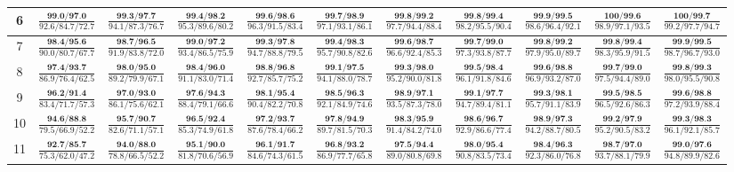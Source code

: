 \documentclass{slides}
\begin{document}
{{{\begin{tabular}{|c|c|c|c|c|c|c|c|c|c|c|}
\hline
6 & $\frac{\textbf{99.0/97.0}}{92.6/84.7/72.7}$ & $\frac{\textbf{99.3/97.7}}{94.1/87.3/76.7}$ & $\frac{\textbf{99.4/98.2}}{95.3/89.6/80.2}$ & $\frac{\textbf{99.6/98.6}}{96.3/91.5/83.4}$ & $\frac{\textbf{99.7/98.9}}{97.1/93.1/86.1}$ & $\frac{\textbf{99.8/99.2}}{97.7/94.4/88.4}$ & $\frac{\textbf{99.8/99.4}}{98.2/95.5/90.4}$ & $\frac{\textbf{99.9/99.5}}{98.6/96.4/92.1}$ & $\frac{\textbf{100/99.6}}{98.9/97.1/93.5}$ & $\frac{\textbf{100/99.7}}{99.2/97.7/94.7}$ \\
\hline
7 & $\frac{\textbf{98.4/95.6}}{90.0/80.7/67.7}$ & $\frac{\textbf{98.7/96.5}}{91.9/83.8/72.0}$ & $\frac{\textbf{99.0/97.2}}{93.4/86.5/75.9}$ & $\frac{\textbf{99.3/97.8}}{94.7/88.8/79.5}$ & $\frac{\textbf{99.4/98.3}}{95.7/90.8/82.6}$ & $\frac{\textbf{99.6/98.7}}{96.6/92.4/85.3}$ & $\frac{\textbf{99.7/99.0}}{97.3/93.8/87.7}$ & $\frac{\textbf{99.8/99.2}}{97.9/95.0/89.7}$ & $\frac{\textbf{99.8/99.4}}{98.3/95.9/91.5}$ & $\frac{\textbf{99.9/99.5}}{98.7/96.7/93.0}$ \\
\hline
8 & $\frac{\textbf{97.4/93.7}}{86.9/76.4/62.5}$ & $\frac{\textbf{98.0/95.0}}{89.2/79.9/67.1}$ & $\frac{\textbf{98.4/96.0}}{91.1/83.0/71.4}$ & $\frac{\textbf{98.8/96.8}}{92.7/85.7/75.2}$ & $\frac{\textbf{99.1/97.5}}{94.1/88.0/78.7}$ & $\frac{\textbf{99.3/98.0}}{95.2/90.0/81.8}$ & $\frac{\textbf{99.5/98.4}}{96.1/91.8/84.6}$ & $\frac{\textbf{99.6/98.8}}{96.9/93.2/87.0}$ & $\frac{\textbf{99.7/99.0}}{97.5/94.4/89.0}$ & $\frac{\textbf{99.8/99.3}}{98.0/95.5/90.8}$ \\
\hline
9 & $\frac{\textbf{96.2/91.4}}{83.4/71.7/57.3}$ & $\frac{\textbf{97.0/93.0}}{86.1/75.6/62.1}$ & $\frac{\textbf{97.6/94.3}}{88.4/79.1/66.6}$ & $\frac{\textbf{98.1/95.4}}{90.4/82.2/70.8}$ & $\frac{\textbf{98.5/96.3}}{92.1/84.9/74.6}$ & $\frac{\textbf{98.9/97.1}}{93.5/87.3/78.0}$ & $\frac{\textbf{99.1/97.7}}{94.7/89.4/81.1}$ & $\frac{\textbf{99.3/98.1}}{95.7/91.1/83.9}$ & $\frac{\textbf{99.5/98.5}}{96.5/92.6/86.3}$ & $\frac{\textbf{99.6/98.8}}{97.2/93.9/88.4}$ \\
\hline
10 & $\frac{\textbf{94.6/88.8}}{79.5/66.9/52.2}$ & $\frac{\textbf{95.7/90.7}}{82.6/71.1/57.1}$ & $\frac{\textbf{96.5/92.4}}{85.3/74.9/61.8}$ & $\frac{\textbf{97.2/93.7}}{87.6/78.4/66.2}$ & $\frac{\textbf{97.8/94.9}}{89.7/81.5/70.3}$ & $\frac{\textbf{98.3/95.9}}{91.4/84.2/74.0}$ & $\frac{\textbf{98.6/96.7}}{92.9/86.6/77.4}$ & $\frac{\textbf{98.9/97.3}}{94.2/88.7/80.5}$ & $\frac{\textbf{99.2/97.9}}{95.2/90.5/83.2}$ & $\frac{\textbf{99.3/98.3}}{96.1/92.1/85.7}$ \\
\hline
11 & $\frac{\textbf{92.7/85.7}}{75.3/62.0/47.2}$ & $\frac{\textbf{94.0/88.0}}{78.8/66.5/52.2}$ & $\frac{\textbf{95.1/90.0}}{81.8/70.6/56.9}$ & $\frac{\textbf{96.1/91.7}}{84.6/74.3/61.5}$ & $\frac{\textbf{96.8/93.2}}{86.9/77.7/65.8}$ & $\frac{\textbf{97.5/94.4}}{89.0/80.8/69.8}$ & $\frac{\textbf{98.0/95.4}}{90.8/83.5/73.4}$ & $\frac{\textbf{98.4/96.3}}{92.3/86.0/76.8}$ & $\frac{\textbf{98.7/97.0}}{93.7/88.1/79.9}$ & $\frac{\textbf{99.0/97.6}}{94.8/89.9/82.6}$ \\

\end{tabular}}}}
\end{document}
